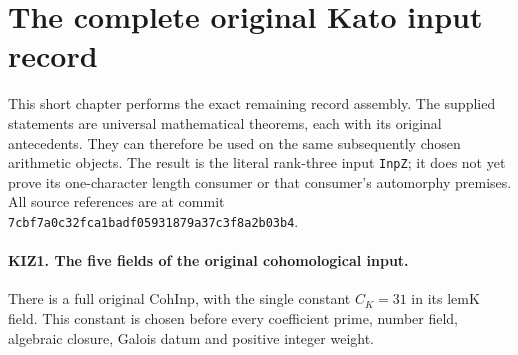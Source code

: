 \section{The complete original Kato input record}
\label{sec:kato-input-assembly-v47}

This short chapter performs the exact remaining record assembly.
The supplied statements are universal mathematical theorems, each
with its original antecedents.  They can therefore be used on the
same subsequently chosen arithmetic objects.  The result is the
literal rank-three input \texttt{InpZ}; it does not yet prove its
one-character length consumer or that consumer's automorphy premises.
All source references are at commit
\texttt{7cbf7a0c32fca1badf05931879a37c3f8a2b03b4}.

\paragraph{KIZ1. The five fields of the original cohomological input.}
\label{claim:KIZ1}
There is a full original \(\mathrm{CohInp}\), with the single
constant \(C_K=31\) in its \(\mathrm{lemK}\) field.  This constant
is chosen before every coefficient prime, number field, algebraic
closure, Galois datum and positive integer weight.

